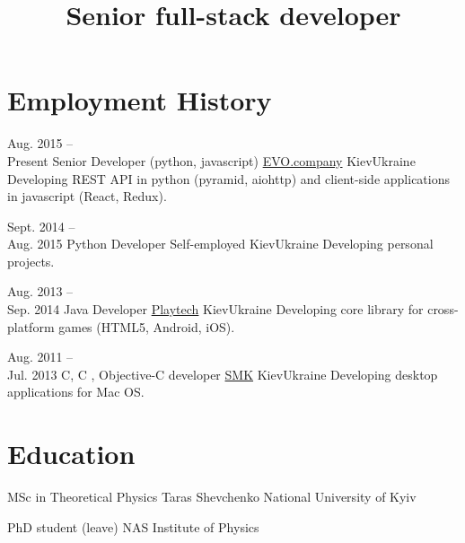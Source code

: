 \documentclass[11pt,a4paper,roman]{moderncv}
\title{Senior full-stack developer}
\begin{document}
\makecvtitle



\section{Employment History}

\cventry
    {Aug. 2015 --\\Present}
    {Senior Developer (python, javascript)}
    {\href{https://evo.company/}{EVO.company}}
    {Kiev}{Ukraine}
    {Developing REST API in python (pyramid, aiohttp) and
     client-side applications in javascript (React, Redux).\newline}

\cventry
    {Sept. 2014 --\\Aug. 2015}
    {Python Developer}
    {Self-employed}
    {Kiev}{Ukraine}
    {Developing personal projects.\newline}

\cventry
    {Aug. 2013 --\\Sep. 2014}
    {Java Developer}
    {\href{https://playtech.com/}{Playtech}}
    {Kiev}{Ukraine}
    {Developing core library for cross-platform games (HTML5, Android, iOS). \newline}

\cventry
    {Aug. 2011 --\\Jul. 2013}
    {C, C\nolinebreak\hspace{-.05em}\raisebox{.3ex}{\footnotesize +}
      \nolinebreak\hspace{-.3em}\raisebox{.3ex}{\footnotesize +}, Objective-C developer}
    {\href{https://www.mackiev.com/}{SMK}}
    {Kiev}{Ukraine}
    {Developing desktop applications for Mac OS.}


\medskip

\section{Education}

        {MSc in Theoretical Physics}
        {Taras Shevchenko National University of Kyiv}{}{}{}

        {PhD student (leave)}
        {NAS Institute of Physics}{}{}{}

\medskip
\end{document}
